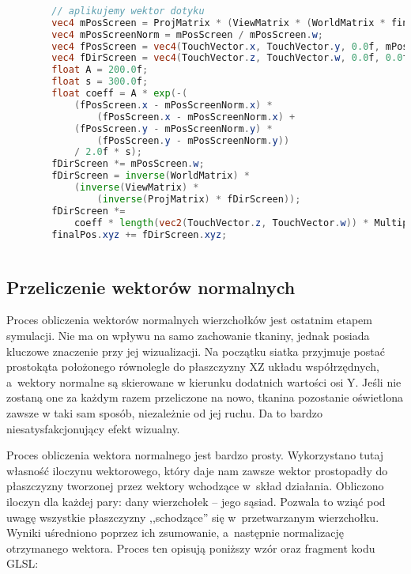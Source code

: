 		\begin{lstlisting}[language=GLSL]
		
		// aplikujemy wektor dotyku
		vec4 mPosScreen = ProjMatrix * (ViewMatrix * (WorldMatrix * finalPos));
		vec4 mPosScreenNorm = mPosScreen / mPosScreen.w;
		vec4 fPosScreen = vec4(TouchVector.x, TouchVector.y, 0.0f, mPosScreenNorm.w);
		vec4 fDirScreen = vec4(TouchVector.z, TouchVector.w, 0.0f, 0.0f);
		float A = 200.0f;
		float s = 300.0f;
		float coeff = A * exp(-(
			(fPosScreen.x - mPosScreenNorm.x) * 
				(fPosScreen.x - mPosScreenNorm.x) +
			(fPosScreen.y - mPosScreenNorm.y) * 
				(fPosScreen.y - mPosScreenNorm.y)) 
			/ 2.0f * s);
		fDirScreen *= mPosScreen.w;
		fDirScreen = inverse(WorldMatrix) * 
			(inverse(ViewMatrix) * 
				(inverse(ProjMatrix) * fDirScreen));
		fDirScreen *= 
			coeff * length(vec2(TouchVector.z, TouchVector.w)) * Multipliers.x;
		finalPos.xyz += fDirScreen.xyz;
		
		\end{lstlisting}
			
		\subsection{Przeliczenie wektorów normalnych}
		\label{t:symulacja:dzialanie:normalne}
			
		
		Proces obliczenia wektorów normalnych wierzchołków jest ostatnim etapem symulacji. Nie ma on wpływu na samo zachowanie tkaniny, jednak posiada kluczowe znaczenie przy jej wizualizacji. Na początku siatka przyjmuje postać prostokąta położonego równolegle do płaszczyzny XZ układu współrzędnych, a~wektory normalne są skierowane w kierunku dodatnich wartości osi Y. Jeśli nie zostaną one za każdym razem przeliczone na nowo, tkanina pozostanie oświetlona zawsze w taki sam sposób, niezależnie od jej ruchu. Da to bardzo niesatysfakcjonujący efekt wizualny.
		
		Proces obliczenia wektora normalnego jest bardzo prosty. Wykorzystano tutaj własność iloczynu wektorowego, który daje nam zawsze wektor prostopadły do płaszczyzny tworzonej przez wektory wchodzące w~skład działania. Obliczono iloczyn dla każdej pary: dany wierzchołek -- jego sąsiad. Pozwala to wziąć pod uwagę wszystkie płaszczyzny ,,schodzące'' się w~przetwarzanym wierzchołku. Wyniki uśredniono poprzez ich zsumowanie, a~następnie normalizację otrzymanego wektora. Proces ten opisują poniższy wzór oraz fragment kodu GLSL:
		
